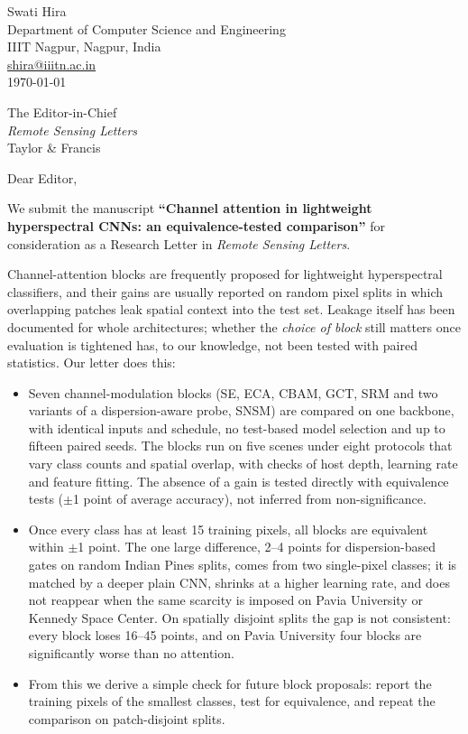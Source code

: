 \documentclass[11pt]{article}
\begin{document}
\begin{flushright}
Swati Hira\\
Department of Computer Science and Engineering\\
IIIT Nagpur, Nagpur, India\\
\url{shira@iiitn.ac.in}\\[4pt]
\today
\end{flushright}

The Editor-in-Chief\\
\textit{Remote Sensing Letters}\\
Taylor \& Francis

Dear Editor,

We submit the manuscript \textbf{``Channel attention in lightweight hyperspectral CNNs: an equivalence-tested comparison''} for consideration as a Research Letter in \textit{Remote Sensing Letters}.

Channel-attention blocks are frequently proposed for lightweight hyperspectral classifiers, and their gains are usually reported on random pixel splits in which overlapping patches leak spatial context into the test set. Leakage itself has been documented for whole architectures; whether the \emph{choice of block} still matters once evaluation is tightened has, to our knowledge, not been tested with paired statistics. Our letter does this:

\begin{itemize}\setlength{\itemsep}{2pt}
\item Seven channel-modulation blocks (SE, ECA, CBAM, GCT, SRM and two variants of a dispersion-aware probe, SNSM) are compared on one backbone, with identical inputs and schedule, no test-based model selection and up to fifteen paired seeds. The blocks run on five scenes under eight protocols that vary class counts and spatial overlap, with checks of host depth, learning rate and feature fitting. The absence of a gain is tested directly with equivalence tests ($\pm$1 point of average accuracy), not inferred from non-significance.
\item Once every class has at least 15 training pixels, all blocks are equivalent within $\pm$1 point. The one large difference, 2--4 points for dispersion-based gates on random Indian Pines splits, comes from two single-pixel classes; it is matched by a deeper plain CNN, shrinks at a higher learning rate, and does not reappear when the same scarcity is imposed on Pavia University or Kennedy Space Center. On spatially disjoint splits the gap is not consistent: every block loses 16--45 points, and on Pavia University four blocks are significantly worse than no attention.
\item From this we derive a simple check for future block proposals: report the training pixels of the smallest classes, test for equivalence, and repeat the comparison on patch-disjoint splits.
\end{itemize}
\end{document}
